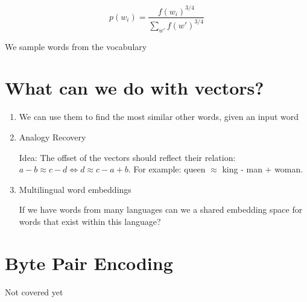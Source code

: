 \documentclass[11pt]{article}
\begin{document}
\begin{equation*}
    p(w_i) = \frac{f(w_i)^{3/4}}{\sum_{w'}f(w')^{3/4}}
\end{equation*}

We sample words from the vocabulary

\section{What can we do with vectors?}

\begin{enumerate}
    \item We can use them to find the most similar other words, given an input word
    \item Analogy Recovery

    Idea: The offset of the vectors should reflect their relation: $a-b \approx c -d \iff d \approx c - a + b$. For example: queen $\approx$ king - man + woman.

    \item Multilingual word embeddings
    
    If we have words from many languages can we a shared embedding space for words that exist within this language?
\end{enumerate}

\section{Byte Pair Encoding}

\begin{warning}
    Not covered yet
\end{warning}

\printbibliography
\end{document}
